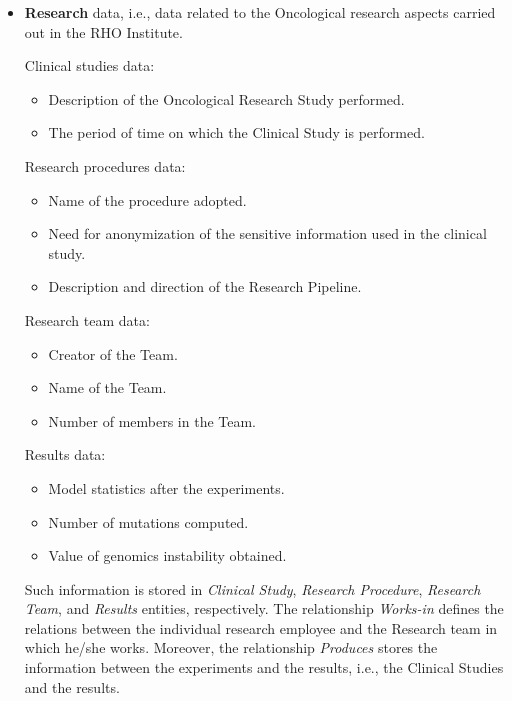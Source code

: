\begin{itemize}
    \item \textbf{Research} data, i.e., data related to the Oncological research aspects carried out in the RHO Institute.

    Clinical studies data:
    \begin{itemize}
        \item Description of the Oncological Research Study performed.
        \item The period of time on which the Clinical Study is performed.
    \end{itemize}
    Research procedures data:
    \begin{itemize}
        \item Name of the procedure adopted.
        \item Need for anonymization of the sensitive information used in the clinical study.
        \item Description and direction of the Research Pipeline.
    \end{itemize}
    Research team data:
    \begin{itemize}
        \item Creator of the Team.
        \item Name of the Team.
        \item Number of members in the Team.
    \end{itemize}
    Results data:
    \begin{itemize}
        \item Model statistics after the experiments.
        \item Number of mutations computed.
        \item Value of genomics instability obtained.
    \end{itemize}
    Such information is stored in \emph{Clinical Study}, \emph{Research Procedure}, \emph{Research Team}, and \emph{Results} entities, respectively. The relationship \emph{Works-in} defines the relations between the individual research employee and the Research team in which he/she works. Moreover, the relationship \emph{Produces} stores the information between the experiments and the results, i.e., the Clinical Studies and the results.
\end{itemize}

